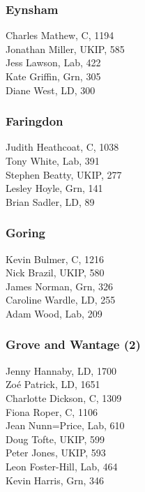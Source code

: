 \documentclass[a4paper,openany,10pt]{book}
\begin{document}
\subsubsection*{Eynsham}



Charles Mathew, C, 1194\\
Jonathan Miller, UKIP, 585\\
Jess Lawson, Lab, 422\\
Kate Griffin, Grn, 305\\
Diane West, LD, 300\\


\subsubsection*{Faringdon}



Judith Heathcoat, C, 1038\\
Tony White, Lab, 391\\
Stephen Beatty, UKIP, 277\\
Lesley Hoyle, Grn, 141\\
Brian Sadler, LD, 89\\


\subsubsection*{Goring}



Kevin Bulmer, C, 1216\\
Nick Brazil, UKIP, 580\\
James Norman, Grn, 326\\
Caroline Wardle, LD, 255\\
Adam Wood, Lab, 209\\


\subsubsection*{Grove and Wantage (2)}



Jenny Hannaby, LD, 1700\\
Zoé Patrick, LD, 1651\\
Charlotte Dickson, C, 1309\\
Fiona Roper, C, 1106\\
Jean Nunn=Price, Lab, 610\\
Doug Tofte, UKIP, 599\\
Peter Jones, UKIP, 593\\
Leon Foster-Hill, Lab, 464\\
Kevin Harris, Grn, 346\\
\end{document}
